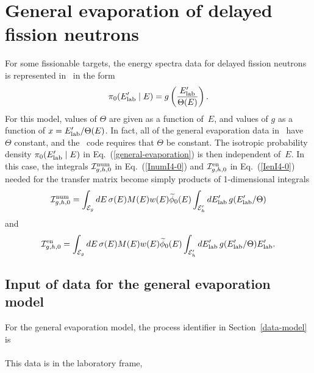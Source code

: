 \section{General evaporation of delayed fission neutrons}
For some fissionable targets, the energy spectra data for delayed
fission neutrons is represented in \xendl\ in the form
\begin{equation}
  \pi_0(E_{\text{lab}}'   \mid E) = g\left(\frac{E_{\text{lab}}'}{\Theta(E)}   \right).
 \label{general-evaporation}
\end{equation}
For this model, values of $\Theta$ are given as a function of~$E$,
and values of $g$ as a function of $x = E_{\text{lab}}'/\Theta(E)$.  In fact, all of the
general evaporation data in \xendl\ have $\Theta$ constant,
and the \gettransfer\ code requires that $\Theta$ be constant.
The isotropic probability density $\pi_0(E_{\text{lab}}'   \mid E)$ in 
Eq.~(\ref{general-evaporation}) is then independent of~$E$.
In this case, the integrals
${\cal I}^{\text{num}}_{g,h,0}$ in Eq.~(\ref{InumI4-0}) and ${\cal I}^{\text{en}}_{g,h,0}$ in Eq.~(\ref{IenI4-0})
needed for the transfer matrix become simply products of 1-dimensional
integrals
$$
   {\cal I}^{\text{num}}_{g,h,0} =
     \int_{{\cal E}_g} dE \, \sigma ( E ) M(E) w(E) \widetilde \phi_0(E)
   \int_{{\cal E}_h'} dE_{\text{lab}}'   \, g(E_{\text{lab}}' /\Theta  )
$$
and
$$
   {\cal I}^{\text{en}}_{g,h,0} =
     \int_{{\cal E}_g} dE \, \sigma ( E ) M(E) w(E) \widetilde \phi_0(E) 
     \int_{{\cal E}_h'} dE_{\text{lab}}'   \, g(E_{\text{lab}}' /\Theta  ) E_{\text{lab}}'  .
$$

\subsection{Input of data for the general evaporation model}
For the general evaporation model, the process identifier in Section~\ref{data-model} is\\
  \\
This data is in the laboratory frame,\\


